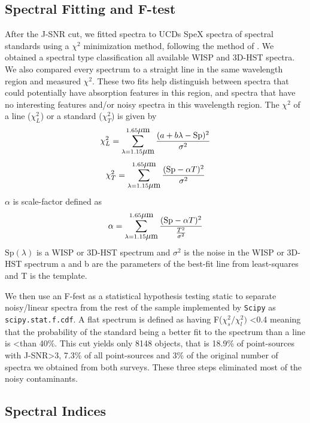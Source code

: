 \documentclass[manuscript]{aastex63}
\begin{document}
\subsection{Spectral Fitting and F-test}
After the J-SNR cut, we fitted spectra to UCDs SpeX spectra of spectral standards using a $\chi^2$ minimization method, following the method of \cite{2010ApJS..190..100K}. We obtained a spectral type classification all available WISP and 3D-HST spectra. We also compared every spectrum to a straight line in the same wavelength region and measured $\chi^2$.  These two fits help distinguish between spectra that could potentially have absorption features in this region, and spectra that have no interesting features  and/or noisy spectra in this wavelength region. The  $\chi^2 $ of a line ($\chi^2 _L $) or a standard ($\chi^2 _T $) is given by 
\begin{equation}
\chi^2 _L  = \sum _{\lambda = 1.15 \micron} ^{ 1.65 \micron} \frac{(a + b \lambda-\text{Sp} )^2}{ \sigma ^2 }
\end{equation}  
\begin{equation}
\chi^2_T= \sum _{\lambda = 1.15 \micron} ^{ 1.65 \micron} \frac{(\text{Sp}  - \alpha T)^2}{ \sigma ^2 }
\end{equation} 
$\alpha$ is scale-factor defined as 
\begin{equation}\alpha= \sum _{\lambda = 1.15 \micron} ^{ 1.65 \micron} \frac{(\text{Sp} - \alpha T)^2}{\frac{T^2}{\sigma ^2 }} 
\end{equation} $\text{Sp}  (\lambda)$ is a WISP or 3D-HST spectrum and $\sigma ^2 $ is the noise in the WISP or 3D-HST spectrum a and b are the parameters of the best-fit line from least-squares and  T is the template.

 We then use an F-fest as a statistical hypothesis testing static to separate noisy/linear spectra from the rest of the sample implemented by \texttt{Scipy} \citealt{scipy} as \texttt{scipy.stat.f.cdf}. A flat spectrum is defined as having F($\chi^2_s/ \chi ^2 _l)$ \textless 0.4 meaning that the probability of the standard being a better fit to the spectrum than a line is \textless than 40\%. This cut yields only 8148 objects, that is 18.9\% of point-sources with J-SNR\textgreater3, 7.3\% of all point-sources and 3\% of the original number of spectra we obtained from both surveys. These three steps eliminated most of the noisy contaminants.

\subsection{Spectral Indices}
\end{document}
